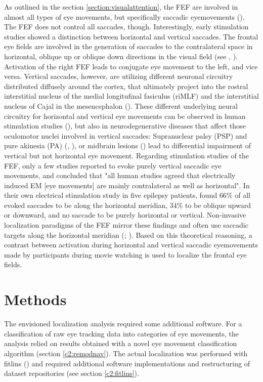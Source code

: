 \documentclass[a4paper, 12pt]{scrreprt}
\begin{document}
As outlined in the section \ref{section:visualattention}, the FEF are involved in almost all types of eye movements, but specifically saccadic eyemovements (\cite{leichnetz1988higher}). The FEF does not control all saccades, though. Interestingly, early stimulation studies showed a distinction between horizontal and vertical saccades. The frontal eye fields are involved in the generation of saccades to the contralateral space in horizontal, oblique up or oblique down directions in the visual field (see \textcite{bruce1985primate}, \textcite{blanke2003direction}). Activation of the right FEF leads to conjugate eye movement to the left, and vice versa. Vertical saccades, however, are utilizing different neuronal circuitry distributed diffusely around the cortex, that ultimately project into the rostral interstitial nucleus of the medial longitufinal fasiculus (riMLF) and the interstitial nucleus of Cajal in the mesencephalon (\cite{FUKUSHIMA1991159}). These different underlying neural circuitry for horizontal and vertical eye movements can be observed in human stimulation studies (\cite{blanke2003direction}), but also in neurodegenerative diseases that affect those oculomotor nuclei involved in vertical saccades: Supranuclear palsy (PSP) and pure akinesia (PA) (\cite{rottach1996dynamic}, \cite{riley1994syndrome}), or midbrain lesions (\cite{ranalli1988palsy}) lead to differential impairment of vertical but not horizontal eye movement. Regarding stimulation studies of the FEF, only a few studies reported to evoke purely vertical saccadic eye movements, and \textcite{blanke2003direction} concluded that "all human studies agreed that electrically induced EM [eye movements] are mainly contralateral as well as horizontal". In their own electrical stimulation study in five epilepsy patients, \textcite{blanke2003direction} found $66\%$ of all evoked saccades to be along the horizontal meridian, $34\%$ to be oblique upward or downward, and no saccade to be purely horizontal or vertical. Non-invasive localization paradigms of the FEF mirror these findings and often use saccadic targets along the horizontal meridian (\cite{connolly2002human}; \cite{alkan2011differentiation}).
Based on this theoretical reasoning, a contrast between activation during horizontal and vertical saccadic eyemovements made by participants during movie watching is used to localize the frontal eye fields.


\section{Methods}
The envisioned localization analysis required some additional software. For a classification of raw eye tracking data into categories of eye movements, the analysis relied on results obtained with a novel eye movement classification algorithm (section \ref{c2:remodnav}). The actual localization was performed with fitlins (\cite{markiewicz_christopher_j_2019_2555453}) and required additional software implementations and restructuring of dataset repositories (see section \ref{c2:fitlins}).
\end{document}
